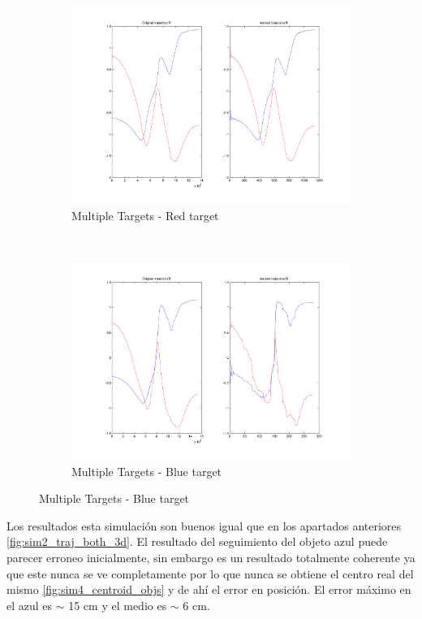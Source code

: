 	\begin{figure}[hp]
		\centering
		\begin{subfigure}[hp]{0.45\linewidth}
			\centering
			\includegraphics[width=\linewidth]{../Images/c3/sim4_redtarget}
			\caption{Multiple Targets - Red target}
			\label{fig:sim4_redtarget}	
		\end{subfigure}
		~
		\begin{subfigure}[hp]{0.45\linewidth}
			\centering
			\includegraphics[width=\linewidth]{../Images/c3/sim4_bluetarget}
			\caption{Multiple Targets - Blue target}
			\label{fig:sim4_bluetarget}
		\end{subfigure}
	\end{figure}
	
	Los resultados esta simulaci\'on son buenos igual que en los apartados anteriores \ref{fig:sim2_traj_both_3d}. El resultado del seguimiento del objeto azul puede parecer erroneo inicialmente, sin embargo es un resultado totalmente coherente ya que este nunca se ve completamente por lo que nunca se obtiene el centro real del mismo \ref{fig:sim4_centroid_objs} y de ah\'i el error en posici\'on. El error m\'aximo en el azul es $\sim$ 15 cm y el medio es $\sim$ 6 cm.



